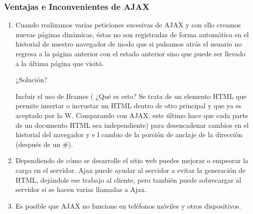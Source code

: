 \documentclass{apuntes}
\begin{document}
\subsubsection{Ventajas e Inconvenientes de AJAX}
\begin{enumerate}
\item Cuando realizamos varias peticiones sucesivas de AJAX y con ello creamos nuevas páginas dinámicas, éstas no son registradas de forma automática en el historial de nuestro navegador de modo que si pulsamos atrás el usuario no regresa a la página anterior con el estado anterior sino que puede ser llevado a la última página que visitó.

 ¿Solución? 

Incluir el uso de Iframes ( ¿Qué es esto?  Se trata de un elemento HTML que permite insertar o incrustar un HTML dentro de otro principal y que ya es aceptado por la W. Comparando con AJAX, este último hace que cada parte de un documento HTML sea independiente) para desencadenar cambios en el historial del navegador y e l cambio de la porción de anclaje de la dirección (después de un \#).

\item Dependiendo de cómo  se desarrolle el sitio web puedes mejorar o empeorar la carga en el servidor. Ajax puede ayudar al servidor a evitar la  generación de HTML, dejándole ese trabajo al cliente, pero también puede sobrecargar al servidor si se hacen varias llamadas a Ajax.

\item Es posible que AJAX no funcione en teléfonos móviles y otros dispositivos.

\end{enumerate}
\end{document}
